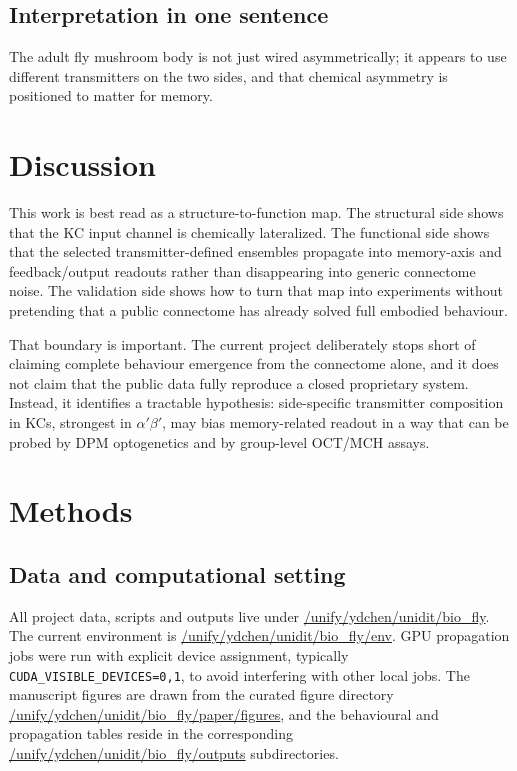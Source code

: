 \documentclass[10pt]{article}
\begin{document}
\subsection*{Interpretation in one sentence}
The adult fly mushroom body is not just wired asymmetrically; it appears to use different transmitters on the two sides, and that chemical asymmetry is positioned to matter for memory.

\section*{Discussion}
This work is best read as a structure-to-function map. The structural side shows that the KC input channel is chemically lateralized. The functional side shows that the selected transmitter-defined ensembles propagate into memory-axis and feedback/output readouts rather than disappearing into generic connectome noise. The validation side shows how to turn that map into experiments without pretending that a public connectome has already solved full embodied behaviour.

That boundary is important. The current project deliberately stops short of claiming complete behaviour emergence from the connectome alone, and it does not claim that the public data fully reproduce a closed proprietary system. Instead, it identifies a tractable hypothesis: side-specific transmitter composition in KCs, strongest in $\alpha'\beta'$, may bias memory-related readout in a way that can be probed by DPM optogenetics and by group-level OCT/MCH assays.

\section*{Methods}
\subsection*{Data and computational setting}
All project data, scripts and outputs live under \url{/unify/ydchen/unidit/bio_fly}. The current environment is \url{/unify/ydchen/unidit/bio_fly/env}. GPU propagation jobs were run with explicit device assignment, typically \texttt{CUDA\_VISIBLE\_DEVICES=0,1}, to avoid interfering with other local jobs. The manuscript figures are drawn from the curated figure directory \url{/unify/ydchen/unidit/bio_fly/paper/figures}, and the behavioural and propagation tables reside in the corresponding \url{/unify/ydchen/unidit/bio_fly/outputs} subdirectories.
\end{document}
